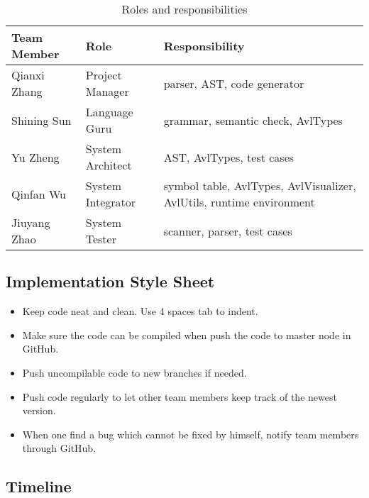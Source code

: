 \begin{table}[htp]
  \centering
  \begin{tabular}{|l|l|l|}
    \hline
    Team Member & Role & Responsibility \\
    \hline
    Qianxi Zhang & Project Manager & parser, AST, code generator \\
    \hline
    Shining Sun & Language Guru & grammar, semantic check, AvlTypes \\
    \hline
    Yu Zheng & System Architect & AST, AvlTypes, test cases \\
    \hline
    Qinfan Wu & System Integrator & symbol table, AvlTypes, AvlVisualizer, AvlUtils, runtime environment \\
    \hline
    Jiuyang Zhao & System Tester & scanner, parser, test cases \\
    \hline
  \end{tabular}
  \caption{Roles and responsibilities}
  \label{tab:roles}
\end{table}

\subsection{Implementation Style Sheet}

\begin{itemize}
\item
Keep code neat and clean. Use 4 spaces tab to indent.
\item
Make sure the code can be compiled when push the code to master node in GitHub.
\item
Push uncompilable code to new branches if needed.
\item
Push code regularly to let other team members keep track of the newest version.
\item
When one find a bug which cannot be fixed by himself, notify team members through GitHub.
\end{itemize}

\subsection{Timeline}


